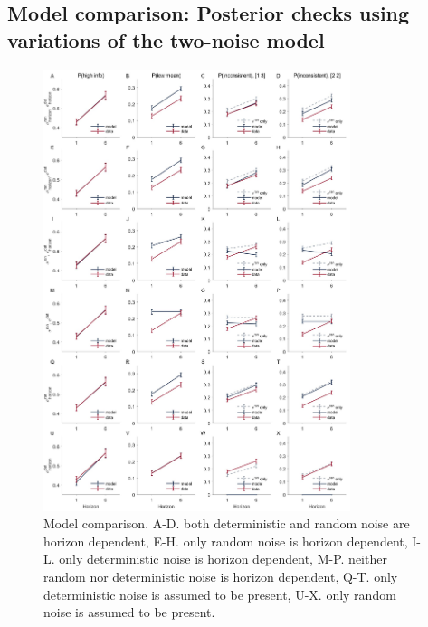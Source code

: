\documentclass[12pt]{article}
\begin{document}
	\subsection{Model comparison: Posterior checks using variations of the two-noise model}
	\begin{figure}[hp]
		\begin{center}
			\includegraphics[width=0.8\textwidth]{figures/RDBayes_2noise_6modelcomparison.jpg}
			\caption{
			Model comparison. A-D. both deterministic and random noise are horizon dependent, E-H. only random noise is horizon dependent, I-L. only deterministic noise is horizon dependent, M-P. neither random nor deterministic noise is horizon dependent, Q-T. only deterministic noise is assumed to be present, U-X. only random noise is assumed to be present.}
			\label{fig:s10}
		\end{center}
	\end{figure}
\end{document}
